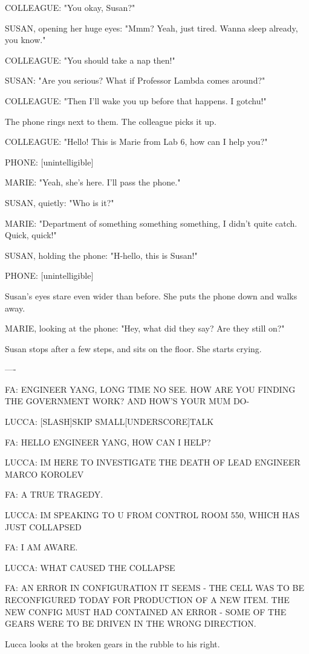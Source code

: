 \documentclass[11pt]{article}
\begin{document}
COLLEAGUE: "You okay, Susan?"

SUSAN, opening her huge eyes: "Mmm? Yeah, just tired. Wanna sleep already, you know."

COLLEAGUE: "You should take a nap then!"

SUSAN: "Are you serious? What if Professor Lambda comes around?"

COLLEAGUE: "Then I'll wake you up before that happens. I gotchu!"

The phone rings next to them. The colleague picks it up. 

COLLEAGUE: "Hello! This is Marie from Lab 6, how can I help you?"

PHONE: [unintelligible]

MARIE: "Yeah, she's here. I'll pass the phone."

SUSAN, quietly: "Who is it?"

MARIE: "Department of something something something, I didn't quite catch. Quick, quick!"

SUSAN, holding the phone: "H-hello, this is Susan!"

PHONE: [unintelligible]

Susan's eyes stare even wider than before. 
She puts the phone down and walks away. 

MARIE, looking at the phone: "Hey, what did they say? Are they still on?"

Susan stops after a few steps, and sits on the floor. She starts crying. 

----

FA: ENGINEER YANG, LONG TIME NO SEE. HOW ARE YOU FINDING THE GOVERNMENT WORK? AND HOW'S YOUR MUM DO-

LUCCA: [SLASH]SKIP SMALL[UNDERSCORE]TALK

FA: HELLO ENGINEER YANG, HOW CAN I HELP? 

LUCCA: IM HERE TO INVESTIGATE THE DEATH OF LEAD ENGINEER MARCO KOROLEV

FA: A TRUE TRAGEDY.

LUCCA: IM SPEAKING TO U FROM CONTROL ROOM 550, WHICH HAS JUST COLLAPSED

FA: I AM AWARE.

LUCCA: WHAT CAUSED THE COLLAPSE

FA: AN ERROR IN CONFIGURATION IT SEEMS - THE CELL WAS TO BE RECONFIGURED TODAY FOR PRODUCTION OF A NEW ITEM. 
THE NEW CONFIG MUST HAD CONTAINED AN ERROR - SOME OF THE GEARS WERE TO BE DRIVEN IN THE WRONG DIRECTION. 

Lucca looks at the broken gears in the rubble to his right. 
\end{document}
